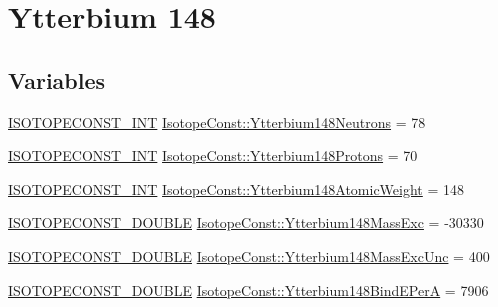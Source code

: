 \hypertarget{group___isotope_const-_ytterbium-_yb148}{}\section{Ytterbium 148}
\label{group___isotope_const-_ytterbium-_yb148}
\subsection*{Variables}
\begin{DoxyCompactItemize}
\item 
\mbox{\hyperlink{group___isotope_const-_macros_ga5f18360b3e99483a35c32d789e62621c}{I\+S\+O\+T\+O\+P\+E\+C\+O\+N\+S\+T\+\_\+\+I\+NT}} \mbox{\hyperlink{group___isotope_const-_ytterbium-_yb148_gaeee5522df35c4a23f35978f6541b979e}{Isotope\+Const\+::\+Ytterbium148\+Neutrons}} = 78
\item 
\mbox{\hyperlink{group___isotope_const-_macros_ga5f18360b3e99483a35c32d789e62621c}{I\+S\+O\+T\+O\+P\+E\+C\+O\+N\+S\+T\+\_\+\+I\+NT}} \mbox{\hyperlink{group___isotope_const-_ytterbium-_yb148_gac3271a07ce3daf46b86186422b59bd7a}{Isotope\+Const\+::\+Ytterbium148\+Protons}} = 70
\item 
\mbox{\hyperlink{group___isotope_const-_macros_ga5f18360b3e99483a35c32d789e62621c}{I\+S\+O\+T\+O\+P\+E\+C\+O\+N\+S\+T\+\_\+\+I\+NT}} \mbox{\hyperlink{group___isotope_const-_ytterbium-_yb148_gaf73f1dd532db76713d8ce2d516edff0d}{Isotope\+Const\+::\+Ytterbium148\+Atomic\+Weight}} = 148
\item 
\mbox{\hyperlink{group___isotope_const-_macros_ga8f45a7272ce02c0b4c65c44636ed719a}{I\+S\+O\+T\+O\+P\+E\+C\+O\+N\+S\+T\+\_\+\+D\+O\+U\+B\+LE}} \mbox{\hyperlink{group___isotope_const-_ytterbium-_yb148_ga7f71fccbdb23c6a511ac8129c88ec805}{Isotope\+Const\+::\+Ytterbium148\+Mass\+Exc}} = -\/30330
\item 
\mbox{\hyperlink{group___isotope_const-_macros_ga8f45a7272ce02c0b4c65c44636ed719a}{I\+S\+O\+T\+O\+P\+E\+C\+O\+N\+S\+T\+\_\+\+D\+O\+U\+B\+LE}} \mbox{\hyperlink{group___isotope_const-_ytterbium-_yb148_gaffa6a513ac6b3828ca9cf69ba44d9f2d}{Isotope\+Const\+::\+Ytterbium148\+Mass\+Exc\+Unc}} = 400
\item 
\mbox{\hyperlink{group___isotope_const-_macros_ga8f45a7272ce02c0b4c65c44636ed719a}{I\+S\+O\+T\+O\+P\+E\+C\+O\+N\+S\+T\+\_\+\+D\+O\+U\+B\+LE}} \mbox{\hyperlink{group___isotope_const-_ytterbium-_yb148_ga32e90806b21b56ef5c0c6237657fc9af}{Isotope\+Const\+::\+Ytterbium148\+Bind\+E\+PerA}} = 7906
\item 

\end{DoxyCompactItemize}
